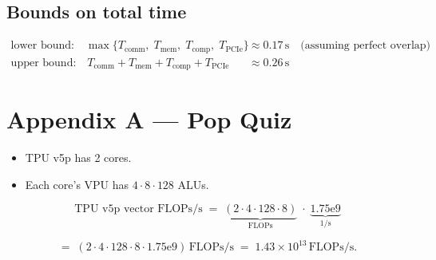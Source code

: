 \documentclass[11pt]{article}
\newcommand{\flops}{\text{FLOPs}}
\newcommand{\flopss}{\text{FLOPs/s}}
\newcommand{\Tmem}{T_{\text{mem}}}
\newcommand{\Tcomm}{T_{\text{comm}}}
\newcommand{\Tcomp}{T_{\text{comp}}}
\newcommand{\TPCIe}{T_{\text{PCIe}}}
\begin{document}
\subsection*{Bounds on total time}
\begin{align*}
\text{lower bound:} \quad \max\{\Tcomm,\; \Tmem,\; \Tcomp,\; \TPCIe\} &\approx 0.17 \,\text{s} \quad \text{(assuming perfect overlap)} \\
\text{upper bound:} \quad \Tcomm + \Tmem + \Tcomp + \TPCIe &\approx 0.26 \,\text{s}
\end{align*}

\appendix

\section*{Appendix A --- Pop Quiz}

\begin{itemize}[leftmargin=*]
  \item TPU v5p has 2 cores.
  \item Each core's VPU has $4 \cdot 8 \cdot 128$ ALUs.
\end{itemize}

\[
\text{TPU v5p vector } \flopss
\;=\;
\underbrace{(2 \cdot 4 \cdot 128 \cdot 8)}_{\flops}
\;\cdot\;
\underbrace{1.75\mathrm{e}9}_{1/\text{s}}
\]

\[
=\;
\left(2 \cdot 4 \cdot 128 \cdot 8 \cdot 1.75\mathrm{e}9\right)\,\flopss
\;=\;
1.43 \times 10^{13}\,\flopss.
\]
\end{document}
